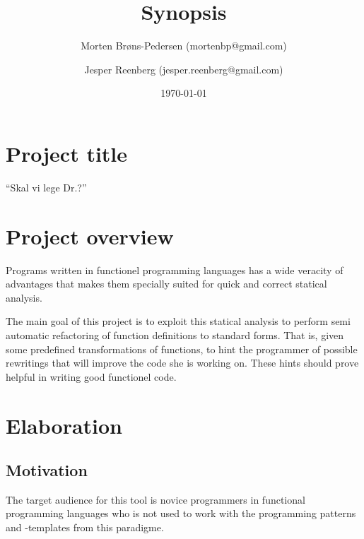 \documentclass[a4paper,oneside]{memoir}
\title{Synopsis}
\author{%
Morten Brøns-Pedersen (mortenbp@gmail.com) \and
Jesper Reenberg (jesper.reenberg@gmail.com)}
\date{\today}
\begin{document}
\maketitle

\section{Project title}

``Skal vi lege Dr.?''

\section{Project overview}

Programs written in functionel programming languages has a wide veracity of
advantages that makes them specially suited for quick and correct statical
analysis.


The main goal of this project is to exploit this statical analysis to
perform semi automatic refactoring of function definitions to standard
forms. That is, given some predefined transformations of functions, to
hint the programmer of possible rewritings that will improve the code
she is working on. These hints should prove helpful in writing good
functionel code.



%

\section{Elaboration}

\subsection{Motivation}

The target audience for this tool is novice programmers in functional
programming languages who is not used to work with the programming patterns
and -templates from this paradigme.
\end{document}
